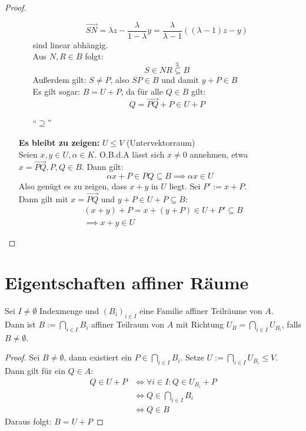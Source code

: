 \documentclass[parskip,a4paper,twoside,DIV15,BCOR12mm]{scrbook}
\begin{document}
\begin{proof}
\begin{itemize}
\begin{enumerate}
\[\overrightarrow{SN} = \lambda z-\frac{\lambda}{1-\lambda}y=\frac{\lambda}{\lambda-1}
((\lambda-1)z-y)\]
sind linear abhängig.\\
Aus $N,R\in B$ folgt:
\[S\in NR \stackrel{3.}{\subseteq}B\]
Außerdem gilt: $S\ne P$, also $SP\in B$ und damit $y+P\in B$\\
Es gilt sogar: $B=U+P$, da für alle $Q\in B$ gilt:
\[Q=\overrightarrow{PQ}+P\in U+P\]
\item["`$\supseteq$"'] \checkmark
\end{enumerate}
\textbf{Es bleibt zu zeigen:} $U\le V$ (Untervektorraum)\\
Seien $x,y\in U,\alpha\in K$. O.B.d.A lässt sich $x\ne 0$ annehmen, etwa $x=\overrightarrow{PQ},
P,Q\in B$. Dann gilt:\\
\[\alpha x+P\in PQ \subseteq B \implies \alpha x\in U\]
Also genügt es zu zeigen, dass $x+y$ in $U$ liegt. Sei $P':=x+P$.\\
Dann gilt mit $x=\overrightarrow{PQ}$ und $y+P\in U+P\subseteq B$:\\
\begin{align*}
&(x+y)+P=x+(y+P)\in U+P'\subseteq B\\
&\implies x+y\in U
\end{align*}
\end{itemize}
\end{proof}

\section{Eigentschaften affiner Räume}
\begin{lemma}
Sei $I\ne\emptyset$ Indexmenge und $(B_i)_{i\in I}$ eine Familie affiner Teilräume von $A$.\\
Dann ist $B:= \bigcap_{i\in I} B_i$ affiner Teilraum von $A$ mit Richtung
$U_B=\bigcap_{i\in I} U_{B_i}$, falls $B\ne\emptyset$.
\end{lemma}

\begin{proof}
Sei $B\ne\emptyset$, dann existiert ein $P\in\bigcap_{i\in I}B_i$.
Setze $U:=\bigcap_{i\in I}U_{B_i} \le V$.\\
Dann gilt für ein $Q\in A$:\\
\begin{align*}
Q\in U+P &\iff \forall i\in I: Q\in U_{B_i}+P\\
&\iff Q\in\bigcap_{i\in I}B_i\\
&\iff Q\in B
\end{align*}
Daraus folgt: $B=U+P$
\end{proof}
\end{document}
